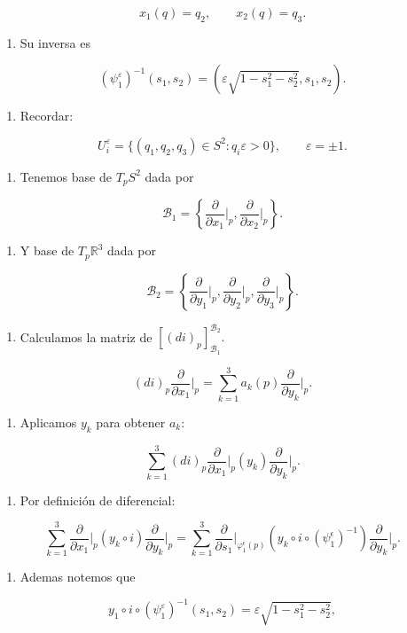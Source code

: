\begin{bookproof}{}
\[
x_1(q)=q_2,\qquad x_2(q)=q_3.
\]
\begin{enumerate}[start=2]
\item Su inversa es
\end{enumerate}
\[
(\psi_1^\varepsilon)^{-1}(s_1,s_2)=(\varepsilon\sqrt{1-s_1^2-s_2^2},s_1,s_2).
\]
\begin{enumerate}[start=3]
\item Recordar:
\end{enumerate}
\[
U_i^\varepsilon=\{(q_1,q_2,q_3)\in S^2:q_i\varepsilon>0\},\qquad \varepsilon=\pm1.
\]
\begin{enumerate}[start=4]
\item Tenemos base de $T_pS^2$ dada por
\end{enumerate}
\[
\mathcal B_1=\left\{\frac{\partial}{\partial x_1}\bigg|_p,\frac{\partial}{\partial x_2}\bigg|_p\right\}.
\]
\begin{enumerate}[start=5]
\item Y base de $T_p\mathbb R^3$ dada por
\end{enumerate}
\[
\mathcal B_2=\left\{\frac{\partial}{\partial y_1}\bigg|_p,\frac{\partial}{\partial y_2}\bigg|_p,\frac{\partial}{\partial y_3}\bigg|_p\right\}.
\]
\begin{enumerate}[start=6]
\item Calculamos la matriz de $[(di)_p]^{\mathcal B_2}_{\mathcal B_1}.$
\end{enumerate}
\[
(di)_p\frac{\partial}{\partial x_1}\bigg|_p=\sum_{k=1}^3 a_k(p)\frac{\partial}{\partial y_k}\bigg|_p.
\]
\begin{enumerate}[start=7]
\item Aplicamos $y_k$ para obtener $a_k$:
\end{enumerate}
\[
\sum_{k=1}^3 (di)_p\frac{\partial}{\partial x_1}\bigg|_p(y_k)\frac{\partial}{\partial y_k}\bigg|_p.
\]
\begin{enumerate}[start=8]
\item Por definición de diferencial:
\end{enumerate}
\[
\sum_{k=1}^3 \frac{\partial}{\partial x_1}\bigg|_p(y_k\circ i)\frac{\partial}{\partial y_k}\bigg|_p=\sum_{k=1}^3 \frac{\partial}{\partial s_1}\bigg|_{\varphi_{1}^{\epsilon} (p)}(y_k\circ i\circ(\psi_{1}^{\epsilon})^{-1} )\frac{\partial}{\partial y_k}\bigg|_p.
\]
\begin{enumerate}[start=9]
\item Ademas notemos que
\end{enumerate}
\[
y_1\circ i\circ(\psi_1^\varepsilon)^{-1}(s_1,s_2)=\varepsilon\sqrt{1-s_1^2-s_2^2},
\]
\end{bookproof}
